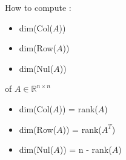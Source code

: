 \documentclass[12pt]{article}
\newcommand*{\xfield}[1]{\begin{mdframed}\centering #1\end{mdframed}\bigskip}
\newenvironment{note}{}{}
\begin{document}
\begin{note}
	\xfield{How to compute :
	\begin{itemize}
		\item dim(Col($A$))
		\item dim(Row($A$))
		\item dim(Nul($A$))
	\end{itemize}
	of $A \in \mathbb{R}^{n\times n}$ }
	\xfield{\begin{itemize}
		\item dim(Col($A$)) = rank($A$)
		\item dim(Row($A$)) = rank($A^T$)
		\item dim(Nul($A$)) = n - rank($A$)
	\end{itemize}}
\end{note}
\end{document}
